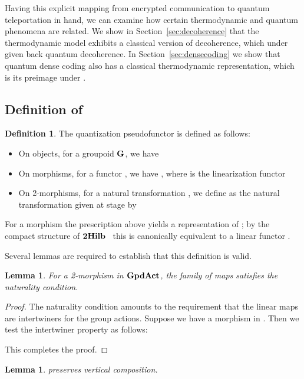 \documentclass[a4paper,12pt]{article}
\newtheorem{lemma}[theorem]{Lemma}
\theoremstyle{definition}
\newtheorem{defn}[theorem]{Definition}
\newcommand\cat[1]{{\ensuremath{\bf #1}}}
\renewcommand{\-}[0]{\nobreakdash-\hspace{0pt}}
\newcommand\GA{\cat{GpdAct}{}}
\begin{document}
Having this explicit mapping from encrypted communication to quantum teleportation in hand, we can examine how certain thermodynamic and quantum phenomena are related. We show in Section~\ref{sec:decoherence} that the thermodynamic model exhibits a classical version of decoherence, which under  given back quantum decoherence. In Section~\ref{sec:densecoding} we show that quantum dense coding also has a classical thermodynamic representation, which is its preimage under .

\subsection{Definition of }
\label{sec:definitionQ}

\begin{defn}
The quantization pseudofunctor is defined as follows:
\begin{itemize}
\item On objects, for a groupoid \cat G, we have 
\item On morphisms, for a functor , we have , where  is the linearization functor
\item On 2-morphisms, for a natural transformation \mbox{}, we define \mbox{} as the natural transformation given at stage  by  
\end{itemize}
\end{defn}

\noindent
For a morphism  the prescription above yields a representation of ; by the compact structure of \cat{2Hilb}~\cite{b97-hda2} this is canonically equivalent to a linear functor .

Several lemmas are required to establish that this definition is valid.

\begin{lemma}
For a 2\-morphism  in \GA, the family of maps  satisfies the naturality condition.
\end{lemma}
\begin{proof}
The naturality condition amounts to the requirement that the linear maps are intertwiners for the group actions. Suppose we have a morphism  in . Then we test the intertwiner property as follows:

This completes the proof.
\end{proof}

\begin{lemma}
  preserves vertical composition.
\end{lemma}
\end{document}
